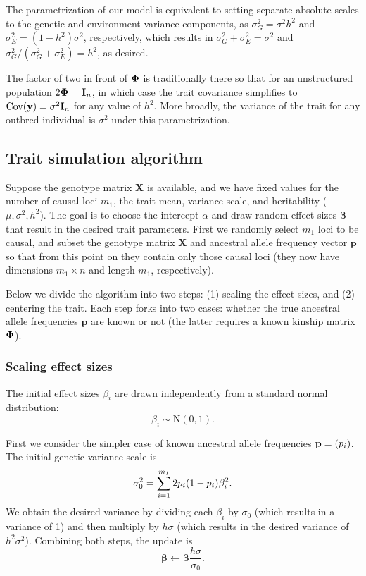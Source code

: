 \documentclass[11pt]{article}
\newcommand{\kinMat}{%
  \ensuremath{%
    \mathbf{\Phi}
  }%
  \xspace%
}%
\begin{document}
The parametrization of our model is equivalent to setting separate absolute scales to the genetic and environment variance components, as $\sigma^2_G = \sigma^2 h^2$ and $\sigma^2_E = (1-h^2) \sigma^2$, respectively, which results in $\sigma^2_G + \sigma^2_E = \sigma^2$ and $\sigma^2_G / (\sigma^2_G + \sigma^2_E) = h^2$, as desired.

The factor of two in front of $\kinMat$ is traditionally there so that for an unstructured population
$2 \kinMat = \mathbf{I}_n$, in which case the trait covariance simplifies to
$\operatorname{Cov}(\mathbf{y}) = \sigma^2 \mathbf{I}_n$ for any value of $h^2$.
More broadly, the variance of the trait for any outbred individual is $\sigma^2$ under this parametrization.

\subsection{Trait simulation algorithm}

Suppose the genotype matrix $\mathbf{X}$ is available, and we have fixed values for the number of causal loci $m_1$, the trait mean, variance scale, and heritability ($\mu, \sigma^2, h^2$).
The goal is to choose the intercept $\alpha$ and draw random effect sizes $\mathbf{\beta}$ that result in the desired trait parameters.
First we randomly select $m_1$ loci to be causal, and subset the genotype matrix $\mathbf{X}$ and ancestral allele frequency vector $\mathbf{p}$ so that from this point on they contain only those causal loci (they now have dimensions $m_1 \times n$ and length $m_1$, respectively).

Below we divide the algorithm into two steps: (1) scaling the effect sizes, and (2) centering the trait.
Each step forks into two cases: whether the true ancestral allele frequencies $\mathbf{p}$ are known or not (the latter requires a known kinship matrix $\kinMat$).

\subsubsection{Scaling effect sizes}

The initial effect sizes $\beta_i$ are drawn independently from a standard normal distribution:
$$
\beta_i \sim \text{N}(0, 1).
$$

First we consider the simpler case of known ancestral allele frequencies $\mathbf{p} = ( p_i  )$.
The initial genetic variance scale is
$$
\sigma^2_0
=
\sum_{i=1}^{m_1} 2  p_i   (1- p_i  ) \beta_i^2
.
$$
We obtain the desired variance by dividing each $\beta_i$ by $\sigma_0$ (which results in a variance of 1) and then multiply by $h \sigma$ (which results in the desired variance of $h^2 \sigma^2$).
Combining both steps, the update is
$$
\mathbf{\beta}
\leftarrow
\mathbf{\beta} \frac{ h \sigma }{\sigma_0}
.
$$
\end{document}
